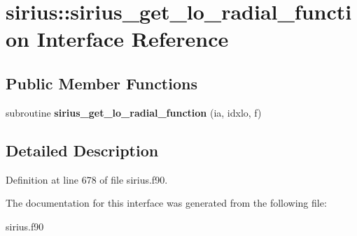 \hypertarget{interfacesirius_1_1sirius__get__lo__radial__function}{}\section{sirius\+:\+:sirius\+\_\+get\+\_\+lo\+\_\+radial\+\_\+function Interface Reference}
\label{interfacesirius_1_1sirius__get__lo__radial__function}
\subsection*{Public Member Functions}
\begin{DoxyCompactItemize}
\item 
\hypertarget{interfacesirius_1_1sirius__get__lo__radial__function_ac071dba4d5feccb722ae42e3f3496d6e}{}subroutine {\bfseries sirius\+\_\+get\+\_\+lo\+\_\+radial\+\_\+function} (ia, idxlo, f)\label{interfacesirius_1_1sirius__get__lo__radial__function_ac071dba4d5feccb722ae42e3f3496d6e}

\end{DoxyCompactItemize}


\subsection{Detailed Description}


Definition at line 678 of file sirius.\+f90.



The documentation for this interface was generated from the following file\+:\begin{DoxyCompactItemize}
\item 
sirius.\+f90\end{DoxyCompactItemize}
